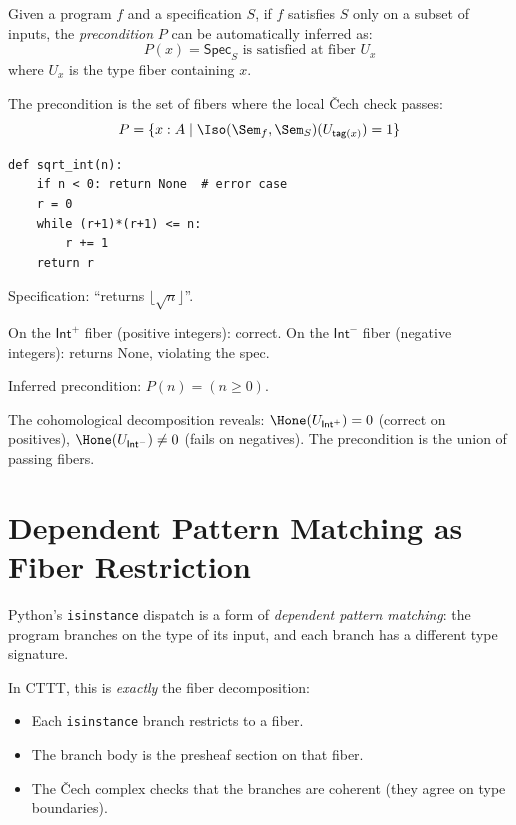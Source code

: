 \begin{theorem}
\label{thm:precondition}
Given a program $f$ and a specification $S$, if $f$ satisfies $S$
only on a subset of inputs, the \emph{precondition} $P$ can be
automatically inferred as:
\[
  P(x) = \mathsf{Spec}_S \text{ is satisfied at fiber } U_x
\]
where $U_x$ is the type fiber containing $x$.

The precondition is the set of fibers where the local \v{C}ech check
passes:
\[
  P = \{x : A \mid \Iso(\Sem_f, \Sem_S)(U_{\mathsf{tag}(x)}) = 1\}
\]
\end{theorem}

\begin{example}
\begin{lstlisting}
def sqrt_int(n):
    if n < 0: return None  # error case
    r = 0
    while (r+1)*(r+1) <= n:
        r += 1
    return r
\end{lstlisting}

Specification: ``returns $\lfloor\sqrt{n}\rfloor$''.

On the $\mathsf{Int}^+$ fiber (positive integers): correct.
On the $\mathsf{Int}^-$ fiber (negative integers): returns None,
violating the spec.

Inferred precondition: $P(n) = (n \geq 0)$.

The cohomological decomposition reveals: $\Hone(U_{\mathsf{Int}^+}) = 0$
(correct on positives), $\Hone(U_{\mathsf{Int}^-}) \neq 0$
(fails on negatives).  The precondition is the union of passing fibers.
\end{example}

\section{Dependent Pattern Matching as Fiber Restriction}

Python's \texttt{isinstance} dispatch is a form of \emph{dependent
pattern matching}: the program branches on the type of its input,
and each branch has a different type signature.

In CTTT, this is \emph{exactly} the fiber decomposition:
\begin{itemize}
  \item Each \texttt{isinstance} branch restricts to a fiber.
  \item The branch body is the presheaf section on that fiber.
  \item The \v{C}ech complex checks that the branches are coherent
    (they agree on type boundaries).
\end{itemize}

